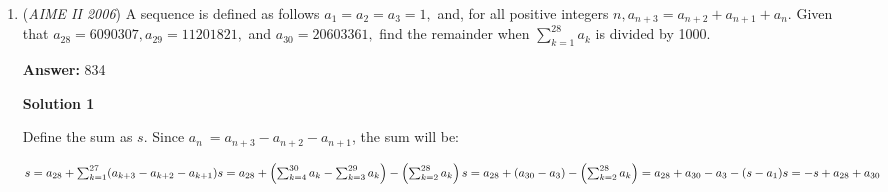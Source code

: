 \begin{enumerate}
 If $B$ has more wins than $A$ in its $5$ remaining games, then $A$ cannot beat $B$ overall. However, if $A$ has more wins or if $A$ and $B$ are tied, $A$ will beat $B$ overall. Therefore, out of the $1024$ possibilites, $386+252 = 638$ ways where $A$ wins, so the desired probability is $\frac{638}{1024} = \frac{319}{512}$, and $m+n=\boxed{831}$.

 



\textbf{Solution 5}

Like Solution 3, we use generating functions, but instead to calculate the difference between $A$'s and $B$'s scores. There is a $\frac{1}{2}$ probability both win, giving a net result $0$, a $\frac{1}{4}$ probability the difference increases by $1$, and a $\frac{1}{4}$ probability it decreases by $1$.

 Since there are $5$ more games for each of $A$ and $B$, the game outcomes are independent, and $A$ starts off having won $1$ more, the generating function is

 
 \[x\cdot \left(\dfrac{1}{4}x+\dfrac{1}{2}+\dfrac{1}{4}x^{-1}\right)^5\]

 Simplifying gives $\dfrac{1}{1024} \cdot x^{-4} \cdot (x+1)^{10}$

 We wish to find the sum of all coefficients of $x,x^2,\ldots,x^6,$ so by the Binomial Formula this is $\dfrac{\binom{10}{5}+\binom{10}{6}+\binom{10}{7}+\binom{10}{8}+\binom{10}{9}+\binom{10}{10}}{1024}=\dfrac{638}{1024}=\dfrac{319}{512}.$

 Hence the answer is $\boxed{831}$.

 


	\item (\textit{AIME II 2006}) A sequence is defined as follows $a_1=a_2=a_3=1,$ and, for all positive integers $n, a_{n+3}=a_{n+2}+a_{n+1}+a_n.$ Given that $a_{28}=6090307, a_{29}=11201821,$ and $a_{30}=20603361,$ find the remainder when $\sum^{28}_{k=1} a_k$ is divided by 1000.


 
 \textbf{Answer: }834



\textbf{Solution 1}

Define the sum as $s$. Since $a_n\ = a_{n + 3} - a_{n + 2} - a_{n + 1}$, the sum will be:

 $s = a_{28} + \sum^{27}_{k=1} (a_{k+3}-a_{k+2}-a_{k+1}) \\ s = a_{28} + \left(\sum^{30}_{k=4} a_{k} - \sum^{29}_{k=3} a_{k}\right) - \left(\sum^{28}_{k=2} a_{k}\right)\\ s = a_{28} + (a_{30} - a_{3}) - \left(\sum^{28}_{k=2} a_{k}\right) = a_{28} + a_{30} - a_{3} - (s - a_{1})\\ s = -s + a_{28} + a_{30}$


\end{enumerate}
